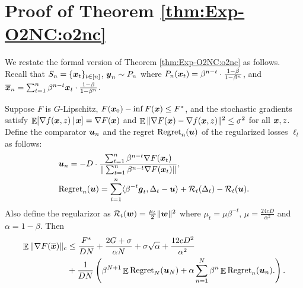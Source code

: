 \section{Proof of Theorem \ref{thm:Exp-O2NC:o2nc}}
\label{app:Exp-O2NC:alg}

We restate the formal version of Theorem \ref{thm:Exp-O2NC:o2nc} as follows.
Recall that $S_n = \{{\boldsymbol{x}}_t\}_{t\in[n]}$, ${\boldsymbol{y}}_n\sim P_n$ where $P_n({\boldsymbol{x}}_t) = \beta^{n-t}\cdot \frac{1-\beta}{1-\beta^n}$, and $\overline {{\boldsymbol{x}}}_n = \sum_{t=1}^n \beta^{n-t}{\boldsymbol{x}}_t\cdot \frac{1-\beta}{1-\beta^n}$.

\begin{theorem}
\label{thm:Exp-O2NC:o2nc-formal}
Suppose $F$ is $G$-Lipschitz, $F({\boldsymbol{x}}_0)-\inf F({\boldsymbol{x}}) \le F^*$, and the stochastic gradients satisfy $\mathop{\mathbb{E}}[\nabla f({\boldsymbol{x}},z)\,|\,{\boldsymbol{x}}] = \nabla F({\boldsymbol{x}})$ and $\mathop{\mathbb{E}}\|\nabla F({\boldsymbol{x}})-\nabla f({\boldsymbol{x}},z)\|^2\le \sigma^2$ for all ${\boldsymbol{x}},z$. Define the comparator ${\boldsymbol{u}}_n$ and the regret $\mathrm{Regret}_n({\boldsymbol{u}})$ of the regularized losses $\ell_t$ as follows:
\begin{align*}
    & {\boldsymbol{u}}_n = -D \cdot \frac{\sum_{t=1}^n \beta^{n-t}\nabla F({\boldsymbol{x}}_t)}{\|\sum_{t=1}^n \beta^{n-t}\nabla F({\boldsymbol{x}}_t)\|}, \\
    & \mathrm{Regret}_n({\boldsymbol{u}}) 
    = \sum_{t=1}^n \langle \beta^{-t}{\boldsymbol{g}}_t, \Delta_t - {\boldsymbol{u}} \rangle + {\cal R}_t(\Delta_t) - {\cal R}_t({\boldsymbol{u}}).
\end{align*}
Also define the regularizor as ${\cal R}_t({\boldsymbol{w}}) = \frac{\mu_t}{2}\|{\boldsymbol{w}}\|^2$ where $\mu_t = \mu\beta^{-t}$, $\mu=\frac{24cD}{\alpha^2}$ and $\alpha=1-\beta$. Then
\begin{align*}
    \mathop{\mathbb{E}} \|\nabla F(\overline{{\boldsymbol{x}}})\|_c
    &\le \frac{F^*}{DN} + \frac{2G+\sigma}{\alpha N} + \sigma\sqrt{\alpha} + \frac{12c D^2}{\alpha^2} \\
    &+ \frac{1}{DN}\left( \beta^{N+1}\mathop{\mathbb{E}}\mathrm{Regret}_N({\boldsymbol{u}}_N) + \alpha \sum_{n=1}^N \beta^n \mathop{\mathbb{E}}\mathrm{Regret}_n({\boldsymbol{u}}_n). \right).
\end{align*}
\end{theorem}

